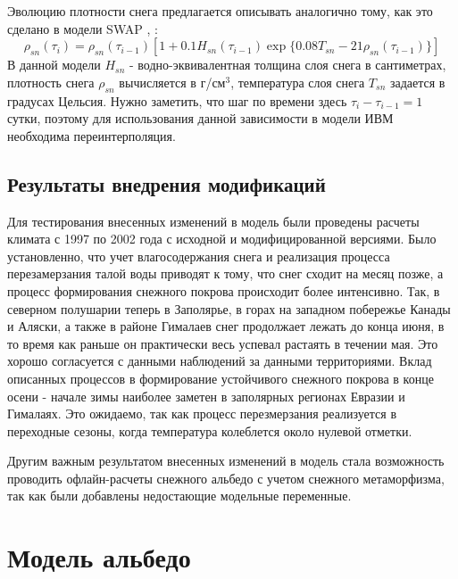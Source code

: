 \documentclass[a4paper, fontsize=14pt]{scrartcl}
\begin{document}
Эволюцию плотности снега предлагается описывать аналогично тому, как это сделано в модели SWAP \cite{Gusev2002}, \cite{YOSIDA1955}:
\begin{equation}
    \rho_{sn}(\tau_i) = \rho_{sn}(\tau_{i-1}) \left[  1 + 0.1 H_{sn}(\tau_{i-1}) \exp \{ 0.08 T_{sn} - 21 \rho_{sn}(\tau_{i-1})  \} \right]    \label{sys}  
\end{equation}
В данной модели $H_{sn}$ - водно-эквивалентная толщина слоя снега в сантиметрах, плотность снега $\rho_{sn}$ вычисляется в г/см$^3$, температура слоя снега $T_{sn}$ задается в градусах Цельсия. Нужно заметить, что шаг по времени здесь $\tau_{i} - \tau_{i-1} = 1$ сутки, поэтому для использования данной зависимости в модели ИВМ необходима переинтерполяция.


\subsection{Результаты внедрения модификаций}


Для тестирования внесенных изменений в модель были проведены расчеты климата с 1997 по 2002 года с исходной и модифицированной версиями. Было установленно, что учет влагосодержания снега и реализация процесса перезамерзания талой воды приводят к тому, что снег сходит на месяц позже, а процесс формирования снежного покрова происходит более интенсивно. Так, в северном полушарии теперь в Заполярье, в горах на западном побережье Канады и Аляски, а также в районе Гималаев снег продолжает лежать до конца июня, в то время как раньше он практически весь успевал растаять в течении мая. Это хорошо согласуется с данными наблюдений за данными территориями. Вклад описанных процессов в формирование устойчивого снежного покрова в конце осени - начале зимы наиболее заметен в заполярных регионах Евразии и Гималаях. Это ожидаемо, так как процесс перезмерзания реализуется в переходные сезоны, когда температура колеблется около нулевой отметки.

Другим важным результатом внесенных изменений в модель стала возможность проводить офлайн-расчеты снежного альбедо с учетом снежного метаморфизма, так как были добавлены недостающие модельные переменные.


\newpage
\section{Модель альбедо}
\end{document}
